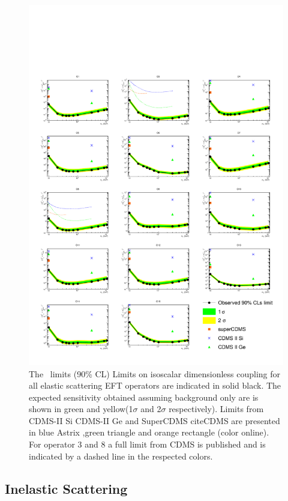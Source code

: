 \begin{figure}
\begin{minipage}{1.\linewidth}{}
\centerline{\includegraphics[]{Figures/TestallLimitsCDMS.pdf}}
\end{minipage}
\caption{The \Xehund\ limits (90\% CL) Limits on isoscalar dimensionless coupling for all elastic scattering EFT operators are indicated in solid black. The expected sensitivity obtained assuming background only are is shown in green and yellow(1$\sigma$ and 2$\sigma$ respectively). Limits from CDMS-II Si CDMS-II Ge and SuperCDMS cite{CDMS} are presented in blue Astrix ,green triangle and orange rectangle (color online). For operator 3 and 8 a full limit from CDMS is published and is indicated by a dashed line in the respected colors.}
\label{fig:elasticLimit}
\end{figure}


\subsection{Inelastic Scattering}

